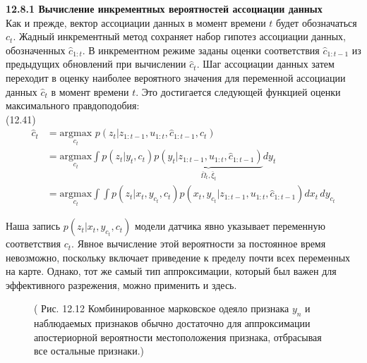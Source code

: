 \documentclass[10pt,a4paper]{article}
\begin{document}
\textbf{12.8.1	Вычисление инкрементных вероятностей ассоциации данных}\\

Как и прежде, вектор ассоциации данных в момент времени $t$ будет обозначаться $c_t$. Жадный инкрементный метод сохраняет набор гипотез ассоциации данных, обозначенных $\hat{c}_{1:t}$. В инкрементном режиме заданы оценки соответствия $\hat{c}_{1:t-1}$ из предыдущих обновлений при вычислении $\hat{c}_t$.  Шаг ассоциации данных затем переходит в оценку наиболее вероятного значения для переменной ассоциации данных $\hat{c}_t$ в момент времени $t$.   Это достигается следующей функцией оценки максимального правдоподобия:\\

(12.41)
\begin{equation*}
\begin{split}
\hat{c}_t&=\underset{c_t}{\text{argmax}}\,\,p(z_t|z_{1:t-1},u_{1:t},\hat{c}_{1:t-1},c_t)\\
&=\underset{c_t}{\text{argmax}}\int p(z_t|y_t,c_t)\underbrace{p(y_t|z_{1:t-1},u_{1:t},\hat{c}_{1:t-1})}_{\bar{\varOmega}_t,\bar{\xi}_t}dy_t\\
&=\underset{c_t}{\text{argmax}}\int\int p(z_t|x_t,y_{c_t},c_t)p(x_t,y_{c_t}|z_{1:t-1},u_{1:t},\hat{c}_{1:t-1})dx_t\,dy_{c_t}
\end{split}
\end{equation*}

Наша запись $p(z_t | x_t, y_{c_t}, c_t)$ модели датчика явно указывает переменную соответствия $c_t$. Явное вычисление этой вероятности за постоянное время невозможно, поскольку включает приведение к пределу почти всех переменных на карте. Однако, тот же самый тип аппроксимации, который был важен для эффективного разрежения, можно применить и здесь.

\begin{figure}[H]
	\caption{ ( Рис. 12.12 Комбинированное марковское одеяло признака $y_n$ и наблюдаемых признаков обычно достаточно для аппроксимации апостериорной вероятности местоположения признака, отбрасывая все остальные признаки.) }
	\label{fig:1212orig}
\end{figure}
\end{document}
